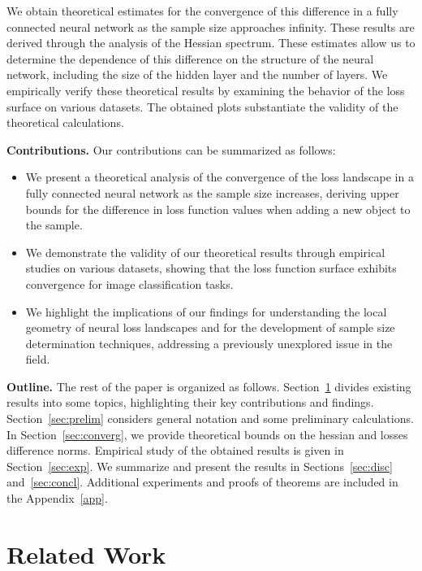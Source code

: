 \documentclass{article}
\begin{document}
We obtain theoretical estimates for the convergence of this difference in a fully connected neural network as the sample size approaches infinity. These results are derived through the analysis of the Hessian spectrum. These estimates allow us to determine the dependence of this difference on the structure of the neural network, including the size of the hidden layer and the number of layers. We empirically verify these theoretical results by examining the behavior of the loss surface on various datasets. The obtained plots substantiate the validity of the theoretical calculations.

\textbf{Contributions.} Our contributions can be summarized as follows:
\begin{itemize}
    \item We present a theoretical analysis of the convergence of the loss landscape in a fully connected neural network as the sample size increases, deriving upper bounds for the difference in loss function values when adding a new object to the sample.
    \item We demonstrate the validity of our theoretical results through empirical studies on various datasets, showing that the loss function surface exhibits convergence for image classification tasks.
    \item We highlight the implications of our findings for understanding the local geometry of neural loss landscapes and for the development of sample size determination techniques, addressing a previously unexplored issue in the field.
\end{itemize}

\textbf{Outline.} The rest of the paper is organized as follows. Section~\ref{sec:rw} divides existing results into some topics, highlighting their key contributions and findings. Section~\ref{sec:prelim} considers general notation and some preliminary calculations. In Section~\ref{sec:converg}, we provide theoretical bounds on the hessian and losses difference norms. Empirical study of the obtained results is given in Section~\ref{sec:exp}. We summarize and present the results in Sections~\ref{sec:disc} and~\ref{sec:concl}. Additional experiments and proofs of theorems are included in the Appendix~\ref{app}.

\section{Related Work}\label{sec:rw}
\end{document}
